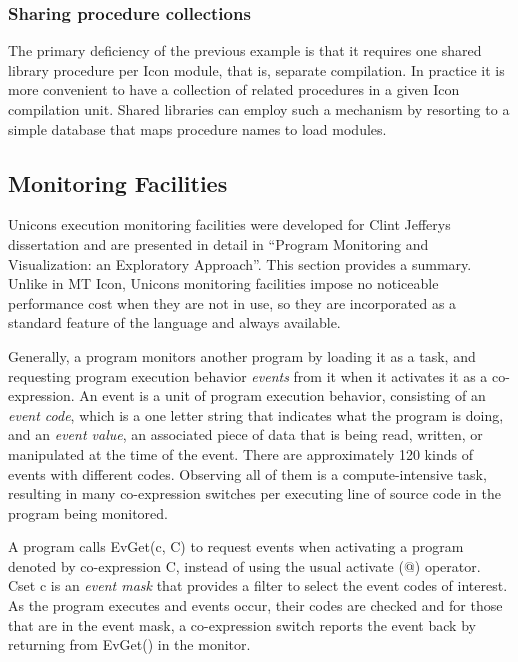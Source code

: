 \subsubsection{Sharing procedure collections}

The primary deficiency of the previous example is that it requires one
shared library procedure per Icon module, that is, separate
compilation. In practice it is more convenient to have a collection of
related procedures in a given Icon compilation unit. Shared libraries
can employ such a mechanism by resorting to a simple database that maps
procedure names to load modules. 

\subsection{Monitoring Facilities}

Unicon{\textquotesingle}s execution monitoring facilities were developed
for Clint Jeffery{\textquotesingle}s dissertation and are presented in
detail in {\textquotedblleft}Program Monitoring and Visualization: an
Exploratory Approach{\textquotedblright}. This section provides a
summary. Unlike in MT Icon, Unicon{\textquotesingle}s monitoring
facilities impose no noticeable performance cost when they are not in
use, so they are incorporated as a standard feature of the language and
always available.

Generally, a program monitors another program by loading it as a task,
and requesting program execution behavior \textit{events} from it when
it activates it as a co-expression. An event is a unit of program
execution behavior, consisting of an \textit{event code}, which is a
one letter string that indicates what the program is doing, and an
\textit{event value}, an associated piece of data that is being read,
written, or manipulated at the time of the event. There are
approximately 120 kinds of events with different codes. Observing all
of them is a compute-intensive task, resulting in many co-expression
switches per executing line of source code in the program being
monitored.

A program calls \textsf{EvGet(c, C)} to request events when activating a
program denoted by co-expression \textsf{C}, instead of using the usual
activate (\textsf{@}) operator. Cset \textsf{c} is an \textit{event
mask} that provides a filter to select the event codes of interest. As
the program executes and events occur, their codes are checked and for
those that are in the event mask, a co-expression switch reports the
event back by returning from \textsf{EvGet()} in the monitor.

